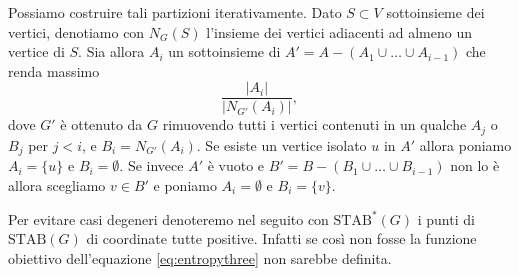 Possiamo costruire tali partizioni iterativamente. Dato \(S\subset V\) sottoinsieme dei vertici, denotiamo con \(N_G(S)\) l'insieme dei vertici adiacenti ad almeno un vertice di \(S\). Sia allora \(A_i\) un sottoinsieme di \(A'=A-(A_1\cup\dots\cup A_{i-1})\) che renda massimo
\[\frac{|A_i|}{|N_{G'}(A_i)|},\]
dove \(G'\) \`e ottenuto da \(G\) rimuovendo tutti i vertici contenuti in un qualche \(A_j\) o \(B_j\) per \(j<i\), e \(B_i=N_{G'}(A_i)\). Se esiste un vertice isolato \(u\) in \(A'\) allora poniamo \(A_i=\{u\}\) e \(B_i=\emptyset\). Se invece \(A'\) \`e vuoto e \(B'=B-(B_1\cup\dots\cup B_{i-1})\) non lo \`e allora scegliamo \(v\in B'\) e poniamo \(A_i=\emptyset\) e \(B_i=\{v\}\).

Per evitare casi degeneri denoteremo nel seguito con \(\text{STAB}^{*}(G)\) i punti di \(\text{STAB}(G)\) di coordinate tutte positive. Infatti se così non fosse la funzione obiettivo dell'equazione \eqref{eq:entropythree} non sarebbe definita.

